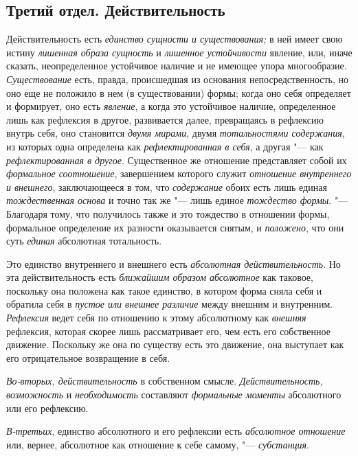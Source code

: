 \subsection[{\em Третий отдел.} ДЕЙСТВИТЕЛЬНОСТЬ]
{Третий отдел. Действительность}

Действительность есть {\em единство сущности и существования;} в ней имеет
свою истину {\em лишенная образа сущность} и
{\em лишенное устойчивости} явление, или, иначе
сказать, неопределенное устойчивое наличие и не имеющее упора многообразие.
{\em Существование} есть, правда, происшедшая из
основания непосредственность, но оно еще не положило в нем (в
существовании) формы; когда оно себя определяет и формирует, оно есть
{\em явление}, а когда это устойчивое наличие,
определенное лишь как рефлексия в другое, развивается далее, превращаясь в
рефлексию внутрь себя, оно становится {\em двумя
мирами}, двумя {\em тотальностями содержания}, из
которых одна определена как {\em рефлектированная в
себя}, а другая "--- как {\em рефлектированная в другое}.
Существенное же отношение представляет собой их
{\em формальное соотношение}, завершением которого
служит {\em отношение внутреннего и внешнего},
заключающееся в том, что {\em содержание} обоих есть
лишь единая {\em тождественная основа} и точно так же
"--- лишь единое {\em тождество формы}. "--- Благодаря тому,
что получилось также и это тождество в отношении формы, формальное
определение их разности оказывается снятым, и
{\em положено}, что они суть {\em единая} абсолютная тотальность.

Это единство внутреннего и внешнего есть {\em абсолютная
действительность}. Но эта действительность есть
{\em ближайшим образом абсолютное} как таковое,
поскольку она положена как такое единство, в котором форма сняла себя и
обратила себя в {\em пустое или внешнее различие} между
внешним и внутренним. {\em Рефлексия} ведет себя по
отношению к этому абсолютному как {\em внешняя}
рефлексия, которая скорее лишь рассматривает его, чем есть его собственное
движение. Поскольку же она по существу есть это движение, она выступает как
его отрицательное возвращение в себя.

{\em Во-вторых, действительность} в собственном смысле.
{\em Действительность, возможность} и {\em необходимость} составляют
{\em формальные моменты} абсолютного или его рефлексию.

{\em В-третьих}, единство абсолютного и его рефлексии
есть {\em абсолютное отношение} или, вернее, абсолютное
как отношение к себе самому, "--- {\em субстанция}.

